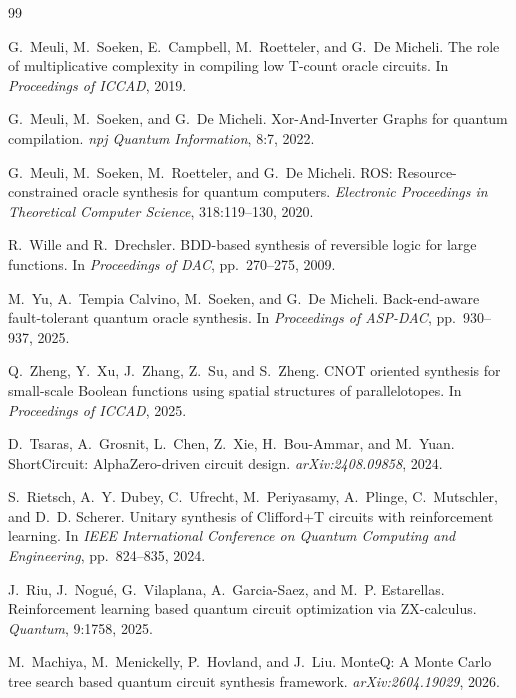 \documentclass[UTF8,fontset=macnew,11pt]{ctexart}
\begin{document}
\begin{thebibliography}{99}

G.~Meuli, M.~Soeken, E.~Campbell, M.~Roetteler, and G.~De Micheli.
\newblock The role of multiplicative complexity in compiling low T-count oracle circuits.
\newblock In \emph{Proceedings of ICCAD}, 2019.

G.~Meuli, M.~Soeken, and G.~De Micheli.
\newblock Xor-And-Inverter Graphs for quantum compilation.
\newblock \emph{npj Quantum Information}, 8:7, 2022.

G.~Meuli, M.~Soeken, M.~Roetteler, and G.~De Micheli.
\newblock ROS: Resource-constrained oracle synthesis for quantum computers.
\newblock \emph{Electronic Proceedings in Theoretical Computer Science}, 318:119--130, 2020.

R.~Wille and R.~Drechsler.
\newblock BDD-based synthesis of reversible logic for large functions.
\newblock In \emph{Proceedings of DAC}, pp.~270--275, 2009.

M.~Yu, A.~Tempia Calvino, M.~Soeken, and G.~De Micheli.
\newblock Back-end-aware fault-tolerant quantum oracle synthesis.
\newblock In \emph{Proceedings of ASP-DAC}, pp.~930--937, 2025.

Q.~Zheng, Y.~Xu, J.~Zhang, Z.~Su, and S.~Zheng.
\newblock CNOT oriented synthesis for small-scale Boolean functions using spatial structures of parallelotopes.
\newblock In \emph{Proceedings of ICCAD}, 2025.

D.~Tsaras, A.~Grosnit, L.~Chen, Z.~Xie, H.~Bou-Ammar, and M.~Yuan.
\newblock ShortCircuit: AlphaZero-driven circuit design.
\newblock \emph{arXiv:2408.09858}, 2024.

S.~Rietsch, A.~Y. Dubey, C.~Ufrecht, M.~Periyasamy, A.~Plinge, C.~Mutschler, and D.~D. Scherer.
\newblock Unitary synthesis of Clifford+T circuits with reinforcement learning.
\newblock In \emph{IEEE International Conference on Quantum Computing and Engineering}, pp.~824--835, 2024.

J.~Riu, J.~Nogu{\'e}, G.~Vilaplana, A.~Garcia-Saez, and M.~P. Estarellas.
\newblock Reinforcement learning based quantum circuit optimization via ZX-calculus.
\newblock \emph{Quantum}, 9:1758, 2025.

M.~Machiya, M.~Menickelly, P.~Hovland, and J.~Liu.
\newblock MonteQ: A Monte Carlo tree search based quantum circuit synthesis framework.
\newblock \emph{arXiv:2604.19029}, 2026.

\end{thebibliography}
\end{document}
